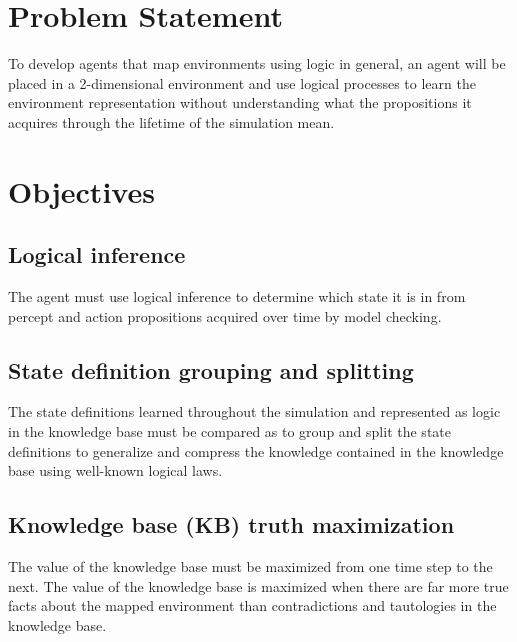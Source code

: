 \section{Problem Statement}


To develop agents that map environments using logic in general, an agent will be placed in a 2-dimensional environment and use logical processes to learn the environment representation without understanding what the propositions it acquires through the lifetime of the simulation mean.


\section{Objectives}


\subsection{Logical inference}
The agent must use logical inference to determine which state it is in from percept and action propositions acquired over time by model checking. 
	
\subsection{State definition grouping and splitting}
The state definitions learned throughout the simulation and represented as logic in the knowledge base must be compared as to group and split the state definitions to generalize and compress the knowledge contained in the knowledge base using well-known logical laws. 

\subsection{Knowledge base (KB) truth maximization}
The value of the knowledge base must be maximized from one time step to the next. The value of the knowledge base is maximized when there are far more true facts about the mapped environment than contradictions and tautologies in the knowledge base. 
	
